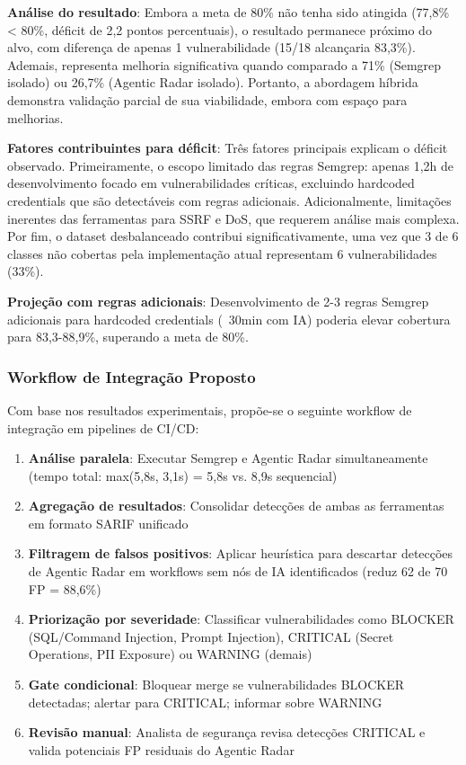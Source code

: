 \documentclass[12pt,a4paper]{article}
\begin{document}
\textbf{Análise do resultado}: Embora a meta de 80\% não tenha sido atingida (77,8\% < 80\%, déficit de 2,2 pontos percentuais), o resultado permanece próximo do alvo, com diferença de apenas 1 vulnerabilidade (15/18 alcançaria 83,3\%). Ademais, representa melhoria significativa quando comparado a 71\% (Semgrep isolado) ou 26,7\% (Agentic Radar isolado). Portanto, a abordagem híbrida demonstra validação parcial de sua viabilidade, embora com espaço para melhorias.

\textbf{Fatores contribuintes para déficit}: Três fatores principais explicam o déficit observado. Primeiramente, o escopo limitado das regras Semgrep: apenas 1,2h de desenvolvimento focado em vulnerabilidades críticas, excluindo hardcoded credentials que são detectáveis com regras adicionais. Adicionalmente, limitações inerentes das ferramentas para SSRF e DoS, que requerem análise mais complexa. Por fim, o dataset desbalanceado contribui significativamente, uma vez que 3 de 6 classes não cobertas pela implementação atual representam 6 vulnerabilidades (33\%).

\textbf{Projeção com regras adicionais}: Desenvolvimento de 2-3 regras Semgrep adicionais para hardcoded credentials (~30min com IA) poderia elevar cobertura para 83,3-88,9\%, superando a meta de 80\%.

\subsubsection{Workflow de Integração Proposto}

Com base nos resultados experimentais, propõe-se o seguinte workflow de integração em pipelines de CI/CD:

\begin{enumerate}
    \item \textbf{Análise paralela}: Executar Semgrep e Agentic Radar simultaneamente (tempo total: max(5,8s, 3,1s) = 5,8s vs. 8,9s sequencial)
    \item \textbf{Agregação de resultados}: Consolidar detecções de ambas as ferramentas em formato SARIF unificado
    \item \textbf{Filtragem de falsos positivos}: Aplicar heurística para descartar detecções de Agentic Radar em workflows sem nós de IA identificados (reduz 62 de 70 FP = 88,6\%)
    \item \textbf{Priorização por severidade}: Classificar vulnerabilidades como BLOCKER (SQL/Command Injection, Prompt Injection), CRITICAL (Secret Operations, PII Exposure) ou WARNING (demais)
    \item \textbf{Gate condicional}: Bloquear merge se vulnerabilidades BLOCKER detectadas; alertar para CRITICAL; informar sobre WARNING
    \item \textbf{Revisão manual}: Analista de segurança revisa detecções CRITICAL e valida potenciais FP residuais do Agentic Radar
\end{enumerate}
\end{document}
